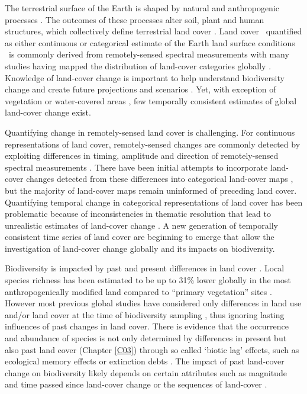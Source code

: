 The terrestrial surface of the Earth is shaped by natural and anthropogenic processes \citep{Foley2005}. The outcomes of these processes alter soil, plant and human structures, which collectively define terrestrial land cover \citep{DiGregorio2000,Lambin2006}. Land cover \textendash\ quantified as either continuous or categorical estimate of the Earth land surface conditions \textendash\ is commonly derived from remotely-sensed spectral measurements with many studies having mapped the distribution of land-cover categories globally \citep{DeFries1994,Hansen2000,Tuanmu2014,Grekousis2015}. Knowledge of land-cover change is important to help understand biodiversity change and create future projections and scenarios \citep{Harfoot2014,Titeux2016,Kehoe2017a}. Yet, with exception of vegetation \citep{Hansen2013,Song2018}
or water-covered areas \citep{Pekel2016}, few temporally consistent estimates of global land-cover change exist.

Quantifying change in remotely-sensed land cover is challenging. For continuous representations of land cover, remotely-sensed changes are commonly detected by exploiting differences in timing, amplitude and direction of remotely-sensed spectral measurements \citep{Coppin2004,Lhermitte2011,Zhu2017}. There have been initial attempts to incorporate land-cover changes detected from these differences into categorical land-cover maps \citep{Zhu2014,Hermosilla2018}, but the majority of land-cover maps remain uninformed of preceding land cover. Quantifying temporal change in categorical representations of land cover has been problematic because of inconsistencies in thematic resolution that lead to unrealistic estimates of land-cover change \citep{VERBURG2011,Cardille2016,Abercrombie2016}. A new generation of temporally consistent time series of land cover \citep{ESA2017,Hermosilla2018,Nowosad2018,Sulla-Menashe2019} are beginning to emerge that allow the investigation of land-cover change globally and its impacts on biodiversity.

Biodiversity is impacted by past and present differences in land cover \citep{Newbold2015,Newbold2016a,Jung2018}. Local species richness has been estimated to be up to 31\% lower globally in the most anthropogenically modified land compared to “primary vegetation” sites \citep{Newbold2015}. However most previous global studies have considered only differences in land use and/or land cover at the time of biodiversity sampling \citep{Gibson2011,Murphy2014,Newbold2015}, thus ignoring lasting influences of past changes in land cover. There is evidence that the occurrence and abundance of species is not only determined by differences in present but also past land cover (Chapter \ref{C03}) through so called ‘biotic lag’ effects, such as ecological memory effects \citep{Ogle2015} or extinction debts \citep{Kuussaari2009}. The impact of past land-cover change on biodiversity likely depends on certain attributes such as magnitude and time passed since land-cover change \citep[Chapter \ref{C03}, ][]{Martin2013,Watson2014,Fu2017} or the sequences of land-cover \citep{Watson2014,Nowosad2018}. 

